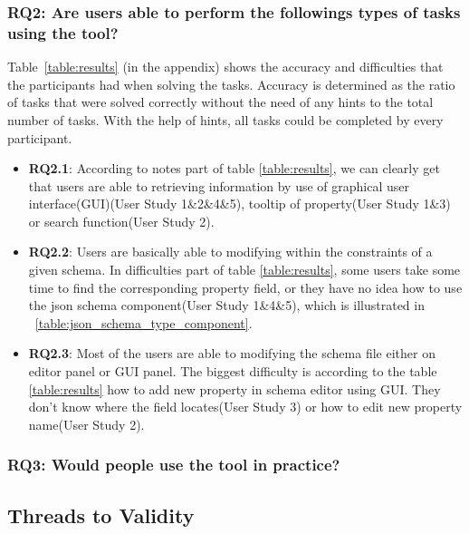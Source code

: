 \subsubsection{\textbf{RQ2:} Are users able to perform the followings types of tasks using the tool?}
Table~\ref{table:results} (in the appendix) shows the accuracy and difficulties that the participants had when solving the tasks.
Accuracy is determined as the ratio of tasks that were solved correctly without the need of any hints to the total number of tasks.
With the help of hints, all tasks could be completed by every participant.
\begin{itemize}
    \item \textbf{RQ2.1}: According to notes part of table \ref{table:results}, we can clearly get that
    users are able to retrieving information by use of graphical user interface(GUI)(User Study 1\&2\&4\&5),
    tooltip of property(User Study 1\&3) or search function(User Study 2).
    \item \textbf{RQ2.2}: Users are basically able to modifying \cfgfiles{} within the constraints of a given schema.
    In difficulties part of table \ref{table:results}, some users take some time to find the corresponding property field,
    or they have no idea how to use the json schema component(User Study 1\&4\&5), which is illustrated in ~\ref{table:json_schema_type_component}.
    \item \textbf{RQ2.3}: Most of the users are able to modifying the schema file either on editor panel or GUI panel.
    The biggest difficulty is according to the table \ref{table:results} how to add new property in schema editor using GUI.
    They don't know where the field locates(User Study 3) or how to edit new property name(User Study 2).
\end{itemize}


\subsubsection{\textbf{RQ3:} Would people use the tool in practice?} %








\subsection{Threads to Validity}\label{subsec:threads_to_validity} %

